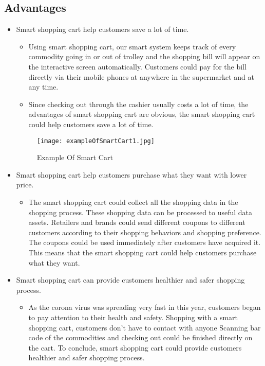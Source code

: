 \documentclass[12pt]{article}
\begin{document}
\subsection{Advantages}
\begin{itemize}
\item Smart shopping cart help customers save a lot of time.
\begin{itemize}
\item Using smart shopping cart, our smart system keeps track of every commodity going in or out of trolley and the shopping bill will appear on the interactive screen automatically. Customers could pay for the bill directly via their mobile phones at anywhere in the supermarket and at any time.
\item Since checking out through the cashier usually costs a lot of time, the advantages of smart shopping cart are obvious, the smart shopping cart could help customers save a lot of time.
\end{itemize}
\begin{figure}[h]
\texttt{[image: exampleOfSmartCart1.jpg]}
\centering
\caption{Example Of Smart Cart}
\end{figure}
\item Smart shopping cart help customers purchase what they want with lower price.
\begin{itemize}
\item The smart shopping cart could collect all the shopping data in the shopping process. These shopping data can be processed to useful data assets. Retailers and brands could send different coupons to different customers according to their shopping behaviors and shopping preference. The coupons could be used immediately after customers have acquired it. This means that the smart shopping cart could help customers purchase what they want.
\end{itemize}
\item Smart shopping cart can provide customers healthier and safer shopping process.
\begin{itemize}
\item As the corona virus was spreading very fast in this year, customers began to pay attention to their health and safety. Shopping with a smart shopping cart, customers don't have to contact with anyone Scanning bar code of the commodities and checking out could be finished directly on the cart. To conclude, smart shopping cart could provide customers healthier and safer shopping process.
\end{itemize}

\end{itemize}
\end{document}
